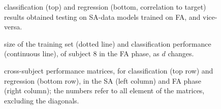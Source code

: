 \documentclass[10pt]{bmc_article}
\def\texttt{[image: ]}
\newenvironment{bmcformat}
  {\begin{raggedright}\baselineskip20pt\sloppy\setboolean{publ}{false}}
  {\end{raggedright}\baselineskip20pt\sloppy}
\begin{document}
\begin{bmcformat}
\begin{figure}[!ht] \centering
   \caption{classification (top) and regression (bottom, correlation to target)
      results obtained testing on SA-data models trained on FA, and vice-versa.}
  \label{fig:2on1}
\end{figure}

\begin{figure}[!ht] \centering
  \caption{size of the training set (dotted line) and classification
    performance (continuous line), of subject $8$ in the FA phase, as
    $d$ changes.}
  \label{fig:subj8}
\end{figure}

\begin{figure}[!ht] \centering
  \caption{cross-subject performance matrices, for classification (top
    row) and regression (bottom row), in the SA (left column)
    and FA phase (right column); the numbers refer to all element of
    the matrices, excluding the diagonals.}
  \label{fig:cross}
\end{figure}

\end{bmcformat}
\end{document}
